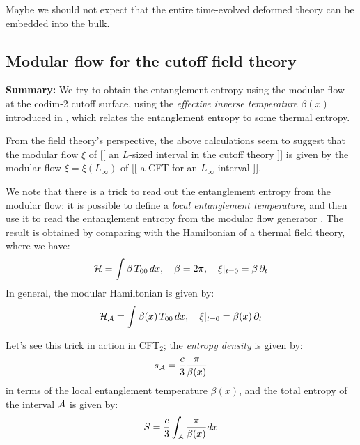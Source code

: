 \documentclass[11pt,a4paper]{article}
\begin{document}
	Maybe we should not expect that the entire time-evolved deformed theory can be embedded into the bulk. 
	
	
\pagebreak
\subsection{Modular flow for the cutoff field theory}
\textbf{Summary:} We try to obtain the entanglement entropy using the modular flow at the \mbox{codim-2} cutoff surface, using the \textit{effective inverse temperature $\beta(x)$} introduced in \cite{Cardy:2016fqc}, which relates the entanglement entropy to some thermal entropy. 
	
	From the field theory's perspective, the above calculations seem to suggest that the modular flow $\xi$ of [[ an $L$-sized interval in the cutoff theory ]] is given by the modular flow $\xi = \xi(L_\infty)$ of [[ a CFT for an $L_\infty$ interval ]]. 
	
	We note that there is a trick to read out the entanglement entropy from the modular flow: it is possible to define a \textit{local entanglement temperature}, and then use it to read the entanglement entropy from the modular flow generator \cite{Cardy:2016fqc}. The result is obtained by comparing with the Hamiltonian of a thermal field theory, where we have:
	\begin{equation}
	\mathcal{H}=\int \beta\,T_{00}\,dx,\quad \beta = 2\pi,
	\quad \xi|_{t=0} = \beta\,\partial_{t}
	\label{eq:beta_thermal}
	\end{equation}
	In general, the modular Hamiltonian is given by:
	\begin{equation}
	\mathcal{H}_{\mathcal{A}}=\int \beta(x)\, T_{00}\,dx,\quad \xi|_{t=0} = \beta(x)\, \partial_{t}
	\end{equation}
	
	Let's see this trick in action in CFT$_2$; the \textit{entropy density} is given by:
	\begin{equation}
	s_{\mathcal{A}} = \frac{c}{3} \frac{\pi}{\beta(x)}
	\end{equation}
	in terms of the local entanglement temperature $\beta(x)$, and the total entropy of the interval $\mathcal{A}$ is given by:
	\begin{equation}
	S= \frac{c}{3}
		\int_{\mathcal{A}} \frac{\pi}{\beta(x)}dx
	\end{equation}
	
\end{document}
